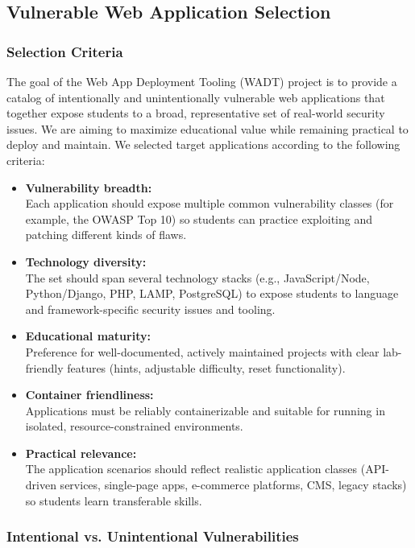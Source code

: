 \documentclass[12pt]{article}
\begin{document}
\subsection{Vulnerable Web Application Selection}

\subsubsection{Selection Criteria}
The goal of the Web App Deployment Tooling (WADT) project is to provide a catalog of intentionally and unintentionally vulnerable web applications that together expose students to a broad, representative set of real-world security issues. We are aiming to maximize educational value while remaining practical to deploy and maintain. We selected target applications according to the following criteria:

\begin{itemize}
    \item \textbf{Vulnerability breadth:}\\ Each application should expose multiple common vulnerability classes (for example, the OWASP Top 10) so students can practice exploiting and patching different kinds of flaws.
    \item \textbf{Technology diversity:}\\ The set should span several technology stacks (e.g., JavaScript/Node, Python/Django, PHP, LAMP, PostgreSQL) to expose students to language and framework-specific security issues and tooling.
    \item \textbf{Educational maturity:}\\ Preference for well-documented, actively maintained projects with clear lab-friendly features (hints, adjustable difficulty, reset functionality).
    \item \textbf{Container friendliness:}\\ Applications must be reliably containerizable and suitable for running in isolated, resource-constrained environments.
    \item \textbf{Practical relevance:}\\ The application scenarios should reflect realistic application classes (API-driven services, single-page apps, e-commerce platforms, CMS, legacy stacks) so students learn transferable skills.
\end{itemize}

\subsubsection{Intentional vs. Unintentional Vulnerabilities}
\end{document}
